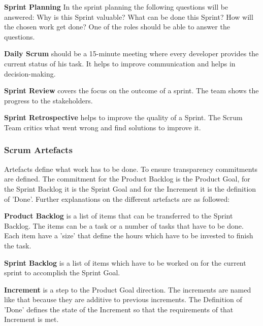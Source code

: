 \textbf{Sprint Planning} In the sprint planning the following questions will be answered: Why is this Sprint valuable? What can be done this Sprint? How will the chosen work get done? One of the roles should be able to answer the questions. \cite{scrum_guide}

\textbf{Daily Scrum} should be a 15-minute meeting where every developer provides the current status of his task. It helps to improve communication and helps in decision-making. \cite{scrum_guide}

\textbf{Sprint Review} covers the focus on the outcome of a sprint. The team shows the progress to the stakeholders. \cite{scrum_guide}

\textbf{Sprint Retrospective} helps to improve the quality of a Sprint. The Scrum Team critics what went wrong and find solutions to improve it. \cite{scrum_guide}

\subsubsection{Scrum Artefacts} \label{sec:Scrum Artefacts}

Artefacts define what work has to be done. To ensure transparency commitments are defined. The commitment for the Product Backlog is the Product Goal, for the Sprint Backlog it is the Sprint Goal and for the Increment it is the definition of 'Done'. Further explanations on the different artefacts are as followed: \cite{scrum_guide}

\textbf{Product Backlog} is a list of items that can be transferred to the Sprint Backlog. The items can be a task or a number of tasks that have to be done. Each item have a 'size' that define the hours which have to be invested to finish the task. \cite{scrum_guide}

\textbf{Sprint Backlog} is a list of items which have to be worked on for the current sprint to accomplish the Sprint Goal. \cite{scrum_guide}

\textbf{Increment} is a step to the Product Goal direction. The increments are named like that because they are additive to previous increments. The Definition of 'Done' defines the state of the Increment so that the requirements of that Increment is met. \cite{scrum_guide}